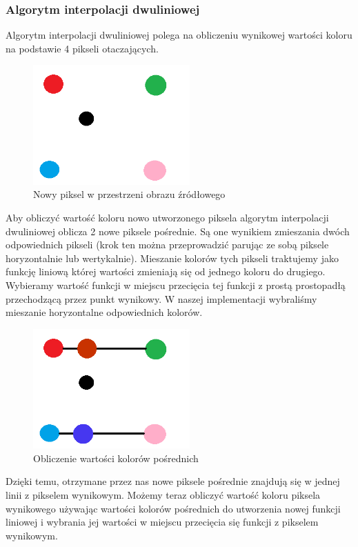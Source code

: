 \documentclass[twoside]{projektInzynierskiMS}
\begin{document}
\subsubsection{Algorytm interpolacji dwuliniowej}
Algorytm interpolacji dwuliniowej polega na obliczeniu wynikowej wartości koloru na podstawie 4 pikseli otaczających.

\begin{figure}[h]
\centering
\includegraphics[width=6cm]{Interpolation1.png}
\caption{Nowy piksel w przestrzeni obrazu źródłowego}
\end{figure}

Aby obliczyć wartość koloru nowo utworzonego piksela algorytm interpolacji dwuliniowej oblicza 2 nowe piksele pośrednie. Są one wynikiem zmieszania dwóch odpowiednich pikseli (krok ten można przeprowadzić parując ze sobą piksele horyzontalnie lub wertykalnie). Mieszanie kolorów tych pikseli traktujemy jako funkcję liniową której wartości zmieniają się od jednego koloru do drugiego. Wybieramy wartość funkcji w miejscu przecięcia tej funkcji z prostą prostopadłą przechodzącą przez punkt wynikowy. W naszej implementacji wybraliśmy mieszanie horyzontalne odpowiednich kolorów.

\begin{figure}[h]
\centering
\includegraphics[width=6cm]{Interpolation2.png}
\caption{Obliczenie wartości kolorów pośrednich}
\end{figure}

Dzięki temu, otrzymane przez nas nowe piksele pośrednie znajdują się w jednej linii z pikselem wynikowym. Możemy teraz obliczyć wartość koloru piksela wynikowego używając wartości kolorów pośrednich do utworzenia nowej funkcji liniowej i wybrania jej wartości w miejscu przecięcia się funkcji z pikselem wynikowym. 
\end{document}
